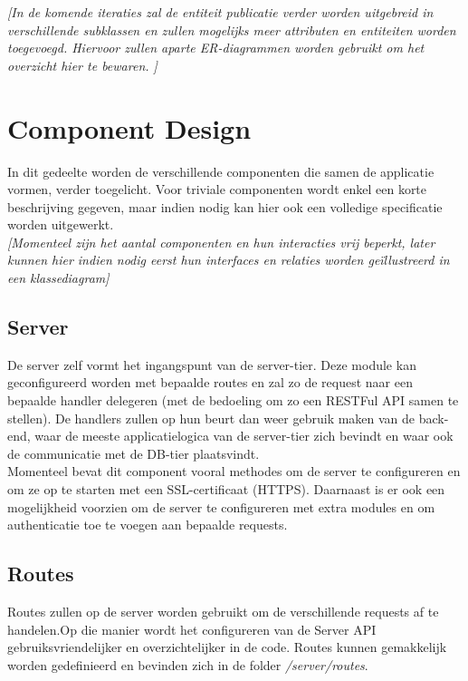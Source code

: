 \documentclass{article}
\begin{document}
\textit{[In de komende iteraties zal de entiteit publicatie verder worden uitgebreid in verschillende subklassen en zullen mogelijks meer attributen en entiteiten worden toegevoegd. Hiervoor zullen aparte ER-diagrammen worden gebruikt om het overzicht hier te bewaren.
]}

\clearpage

\section{Component Design}
\label{sec:components}

In dit gedeelte worden de verschillende componenten die samen de applicatie vormen, verder toegelicht. Voor triviale componenten wordt enkel een korte beschrijving gegeven, maar indien nodig kan hier ook een volledige specificatie worden uitgewerkt. \\

\textit{[Momenteel zijn het aantal componenten en hun interacties vrij beperkt, later kunnen hier indien nodig eerst hun interfaces en relaties worden ge\"illustreerd in een klassediagram]}

\subsection{Server}

De server zelf vormt het ingangspunt van de server-tier. Deze module kan geconfigureerd worden met bepaalde routes en zal zo de request naar een bepaalde handler delegeren (met de bedoeling om zo een RESTFul API samen te stellen). De handlers zullen op hun beurt dan weer gebruik maken van de back-end, waar de meeste applicatielogica van de server-tier zich bevindt en waar ook de communicatie met de DB-tier plaatsvindt.  \\

Momenteel bevat dit component vooral methodes om de server te configureren en om ze op te starten met een SSL-certificaat (HTTPS). Daarnaast is er ook een mogelijkheid voorzien om de server te configureren met extra modules en om authenticatie toe te voegen aan bepaalde requests.

\subsection{Routes}

Routes zullen op de server worden gebruikt om de verschillende requests af te handelen.Op die manier wordt het configureren van de Server API gebruiksvriendelijker en overzichtelijker in de code. Routes kunnen gemakkelijk worden gedefinieerd en bevinden zich in de folder \textit{/server/routes}.\\
\end{document}
